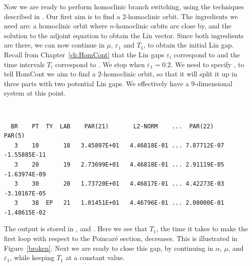\documentclass[12pt]{report}
\begin{document}
Now we are ready to perform homoclinic branch switching, using
the techniques described in \cite{OlChKr:03}. 
Our first aim is to find a 2-homoclinic orbit. The
ingredients we need are: a homoclinic orbit where $n$-homoclinic orbits
are close by, and the solution to the adjoint equation to
obtain the Lin vector. Since both ingredients are there, we can now
continue in $\mu$, $\varepsilon_1$ and $T_1$, to obtain the initial
Lin gap. Recall from Chapter~\ref{ch:HomCont} that the Lin gaps 
$\varepsilon_i$ correspond to
 and the time intervals $T_i$ 
correspond to . We stop when
$\varepsilon_1=0.2$. We need to specify , to tell 
{\cal HomCont} we
aim to find a 2-homoclinic orbit, so that it will split it up in three
parts with two potential Lin gaps. We effectively have a 9-dimensional
system at this point.
\begin{center}
 \\
\end{center} 
\begin{verbatim}
  BR    PT  TY  LAB    PAR(21)       L2-NORM    ...  PAR(22)       PAR(5)     
   3    10       18   3.45897E+01   4.46818E-01 ... 7.87712E-07  -1.55885E-11
   3    20       19   2.73699E+01   4.46818E-01 ... 2.91119E-05  -1.63974E-09
   3    30       20   1.73720E+01   4.46817E-01 ... 4.42273E-03  -3.10167E-05
   3    38  EP   21   1.01451E+01   4.46796E-01 ... 2.00000E-01  -1.48615E-02
\end{verbatim}
The output is stored in ,   and .
Here we see that $T_1$, the time it takes to make the first loop with
respect to the Poincar\'e section, decreases. This is illustrated in
Figure~\ref{broken}. Next we are ready to close this gap, by continuing
in $\alpha$, $\mu$, and $\varepsilon_1$, while keeping $T_1$ at a
constant value.
\end{document}
